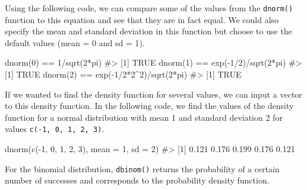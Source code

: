 \documentclass[
  letterpaper,
]{latex/krantz}
\makeatletter
\newenvironment{Shaded}{\begin{snugshade}}{\end{snugshade}}
\newcommand{\AttributeTok}[1]{\textcolor[rgb]{0.40,0.45,0.13}{#1}}
\newcommand{\CommentTok}[1]{\textcolor[rgb]{0.37,0.37,0.37}{#1}}
\newcommand{\DecValTok}[1]{\textcolor[rgb]{0.68,0.00,0.00}{#1}}
\newcommand{\FunctionTok}[1]{\textcolor[rgb]{0.28,0.35,0.67}{#1}}
\newcommand{\NormalTok}[1]{\textcolor[rgb]{0.00,0.23,0.31}{#1}}
\newcommand{\SpecialCharTok}[1]{\textcolor[rgb]{0.37,0.37,0.37}{#1}}
\newenvironment{kframe}{%
\medskip{}
\setlength{\fboxsep}{.8em}
 \def\at@end@of@kframe{}%
 \ifinner\ifhmode%
  \def\at@end@of@kframe{\end{minipage}}%
  \begin{minipage}{\columnwidth}%
 \fi\fi%
 \def\FrameCommand##1{\hskip\@totalleftmargin \hskip-\fboxsep
 \colorbox{shadecolor}{##1}\hskip-\fboxsep
     \hskip-\linewidth \hskip-\@totalleftmargin \hskip\columnwidth}%
 \MakeFramed {\advance\hsize-\width
   \@totalleftmargin\z@ \linewidth\hsize
   \@setminipage}}%
 {\par\unskip\endMakeFramed%
 \at@end@of@kframe}
\renewenvironment{Shaded}{\begin{kframe}}{\end{kframe}}
\makeatother
\begin{document}
Using the following code, we can compare some of the values from the
\texttt{dnorm()} function to this equation and see that they are in fact
equal. We could also specify the mean and standard deviation in this
function but choose to use the default values (mean = 0 and sd = 1).

\begin{Shaded}
\begin{Highlighting}[]
\FunctionTok{dnorm}\NormalTok{(}\DecValTok{0}\NormalTok{) }\SpecialCharTok{==} \DecValTok{1}\SpecialCharTok{/}\FunctionTok{sqrt}\NormalTok{(}\DecValTok{2}\SpecialCharTok{*}\NormalTok{pi)}
\CommentTok{\#\textgreater{} [1] TRUE}
\FunctionTok{dnorm}\NormalTok{(}\DecValTok{1}\NormalTok{) }\SpecialCharTok{==} \FunctionTok{exp}\NormalTok{(}\SpecialCharTok{{-}}\DecValTok{1}\SpecialCharTok{/}\DecValTok{2}\NormalTok{)}\SpecialCharTok{/}\FunctionTok{sqrt}\NormalTok{(}\DecValTok{2}\SpecialCharTok{*}\NormalTok{pi)}
\CommentTok{\#\textgreater{} [1] TRUE}
\FunctionTok{dnorm}\NormalTok{(}\DecValTok{2}\NormalTok{) }\SpecialCharTok{==} \FunctionTok{exp}\NormalTok{(}\SpecialCharTok{{-}}\DecValTok{1}\SpecialCharTok{/}\DecValTok{2}\SpecialCharTok{*}\DecValTok{2}\SpecialCharTok{\^{}}\DecValTok{2}\NormalTok{)}\SpecialCharTok{/}\FunctionTok{sqrt}\NormalTok{(}\DecValTok{2}\SpecialCharTok{*}\NormalTok{pi)}
\CommentTok{\#\textgreater{} [1] TRUE}
\end{Highlighting}
\end{Shaded}

If we wanted to find the density function for several values, we can
input a vector to this density function. In the following code, we find
the values of the density function for a normal distribution with mean 1
and standard deviation 2 for values \texttt{c(-1,\ 0,\ 1,\ 2,\ 3)}.

\begin{Shaded}
\begin{Highlighting}[]
\FunctionTok{dnorm}\NormalTok{(}\FunctionTok{c}\NormalTok{(}\SpecialCharTok{{-}}\DecValTok{1}\NormalTok{, }\DecValTok{0}\NormalTok{, }\DecValTok{1}\NormalTok{, }\DecValTok{2}\NormalTok{, }\DecValTok{3}\NormalTok{), }\AttributeTok{mean =} \DecValTok{1}\NormalTok{, }\AttributeTok{sd =} \DecValTok{2}\NormalTok{)}
\CommentTok{\#\textgreater{} [1] 0.121 0.176 0.199 0.176 0.121}
\end{Highlighting}
\end{Shaded}

For the binomial distribution, \texttt{dbinom()} returns the probability
of a certain number of successes and corresponds to the probability
density function.
\end{document}
